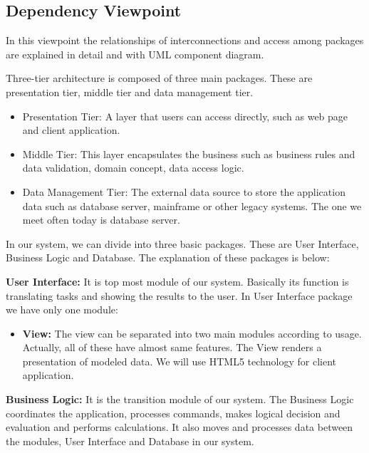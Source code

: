 \subsection{Dependency Viewpoint}
\par In this viewpoint the relationships of interconnections and access among packages are explained in detail and with UML component diagram.
\par Three-tier architecture is composed of three main packages. These are presentation tier, middle tier and data management tier.
\begin{itemize}
  \setlength{\itemsep}{1pt}
    \setlength{\parskip}{1pt}
  \item Presentation Tier: A layer that users can access directly, such as web page and client application.
  \item Middle Tier: This layer encapsulates the business such as business rules and data validation, domain concept, data access logic.
  \item Data Management Tier: The external data source to store the application data such as database server, mainframe or other legacy systems. The one we meet often today is database server.
\end{itemize}
\qquad In our system, we can divide into three basic packages. These are User Interface, Business Logic and Database. The explanation of these packages is below:
\par\textbf{User Interface:} It is top most module of our system. Basically its function is translating tasks and showing the results to the user. In User Interface package we have only one module:
\begin{itemize}
  \setlength{\itemsep}{1pt}
    \setlength{\parskip}{1pt}
  \setlength{\itemsep}{1pt}
    \setlength{\parskip}{1pt}
  \item \textbf{View:} The view can be separated into two main modules according to usage. Actually, all of these have almost same features. The View renders a presentation of modeled data. We will use HTML5 technology for client application.
\end{itemize}
\par \textbf{Business Logic:} It is the transition module of our system. The Business Logic coordinates the application, processes commands, makes logical decision and evaluation and performs calculations. It also moves and processes data between the modules, User Interface and Database in our system.
